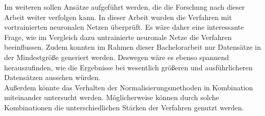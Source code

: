 Im  weiteren sollen Ansätze aufgeführt werden, die die Forschung nach dieser Arbeit weiter verfolgen kann. In dieser Arbeit wurden die Verfahren mit vortrainierten neuronalen Netzen überprüft. Es wäre daher eine interessante Frage, wie im Vergleich dazu untrainierte neuronale Netze die Verfahren beeinflussen. Zudem konnten im Rahmen dieser Bachelorarbeit nur Datensätze in der Mindestgröße generiert werden. Deswegen wäre es ebenso spannend herauszufinden, wie die Ergebnisse bei wesentlich größeren und ausführlicheren Datensätzen aussehen würden.\\
Außerdem könnte das Verhalten der Normalisierungsmethoden in Kombination miteinander untersucht werden. Möglicherweise können durch solche Kombinationen die unterschiedlichen Stärken der Verfahren genutzt werden.  